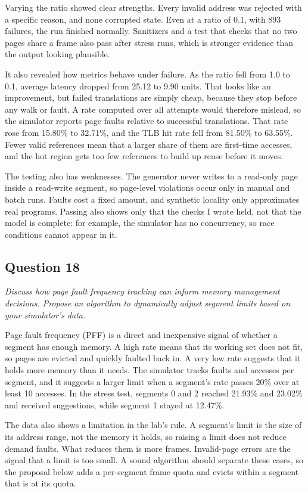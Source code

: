 \documentclass[11pt]{article}
\newcommand{\question}[2]{\subsection*{Question #1}\noindent\textit{#2}\par\medskip}
\begin{document}
Varying the ratio showed clear strengths. Every invalid address was rejected with a
specific reason, and none corrupted state. Even at a ratio of 0.1, with 893 failures,
the run finished normally. Sanitizers and a test that checks that no two pages share
a frame also pass after stress runs, which is stronger evidence than the output
looking plausible.

It also revealed how metrics behave under failure. As the ratio fell from 1.0 to 0.1,
average latency dropped from 25.12 to 9.90 units. That looks like an improvement, but
failed translations are simply cheap, because they stop before any walk or fault. A
rate computed over all attempts would therefore mislead, so the simulator reports page
faults relative to successful translations. That rate rose from 15.80\% to 32.71\%,
and the TLB hit rate fell from 81.50\% to 63.55\%. Fewer valid references mean that a
larger share of them are first-time accesses, and the hot region gets too few
references to build up reuse before it moves.

The testing also has weaknesses. The generator never writes to a read-only page inside
a read-write segment, so page-level violations occur only in manual and batch runs. Faults
cost a fixed amount, and synthetic locality only approximates real programs. Passing
also shows only that the checks I wrote held, not that the model is complete: for
example, the simulator has no concurrency, so race conditions cannot appear in it.

\question{18}{Discuss how page fault frequency tracking can inform memory management decisions. Propose an algorithm to dynamically adjust segment limits based on your simulator's data.}
Page fault frequency (PFF) is a direct and inexpensive signal of whether a segment has
enough memory. A high rate means that its working set does not fit, so pages are
evicted and quickly faulted back in. A very low rate suggests that it holds more
memory than it needs. The simulator tracks faults and accesses per segment, and it
suggests a larger limit when a segment's rate passes 20\% over at least 10 accesses.
In the stress test, segments 0 and 2 reached 21.93\% and 23.02\% and received
suggestions, while segment 1 stayed at 12.47\%.

The data also shows a limitation in the lab's rule. A segment's limit is the size of
its address range, not the memory it holds, so raising a limit does not reduce demand
faults. What reduces them is more frames. Invalid-page errors are the signal that a
limit is too small. A sound algorithm should separate these cases, so the proposal
below adds a per-segment frame quota and evicts within a segment that is at its quota.
\end{document}
